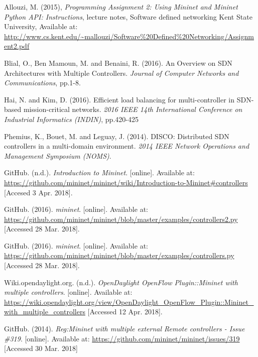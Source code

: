 \documentclass[12pt, a4paper]{article}
\begin{document}
\begin{thebibliography}{99}
  \footnotesize

  Allouzi, M. (2015),
  \textit{Programming Assignment 2: Using Mininet and Mininet Python API: Instructions},
  lecture notes,
  Software defined networking Kent State University,
  Available at: {\scriptsize \url{http://www.cs.kent.edu/~mallouzi/Software%20Defined%20Networking/Assignment2.pdf}}

  Blial, O., Ben Mamoun, M. and Benaini, R. (2016).
  An Overview on SDN Architectures with Multiple Controllers.
  \textit{Journal of Computer Networks and Communications}, pp.1-8.

  Hai, N. and Kim, D. (2016).
  Efficient load balancing for multi-controller in SDN-based mission-critical networks.
  \textit{2016 IEEE 14th International Conference on Industrial Informatics (INDIN)}, pp.420-425

  Phemius, K., Bouet, M. and Leguay, J. (2014).
  DISCO: Distributed SDN controllers in a multi-domain environment.
  \textit{2014 IEEE Network Operations and Management Symposium (NOMS)}.

  GitHub. (n.d.).
  \textit{Introduction to Mininet}. [online].
  Available at: {\scriptsize \url{https://github.com/mininet/mininet/wiki/Introduction-to-Mininet#controllers}}
  [Accesed 3 Apr. 2018].

  GitHub. (2016).
  \textit{mininet}. [online].
  Available at: {\scriptsize \url{https://github.com/mininet/mininet/blob/master/examples/controllers2.py}}
  [Accessed 28 Mar. 2018].

  GitHub. (2016).
  \textit{mininet}. [online].
  Available at: {\scriptsize \url{https://github.com/mininet/mininet/blob/master/examples/controllers.py}}
  [Accessed 28 Mar. 2018].

   Wiki.opendaylight.org. (n.d.).
   \textit{OpenDaylight OpenFlow Plugin::Mininet with multiple controllers}. [online].
   Available at: {\scriptsize \url{https://wiki.opendaylight.org/view/OpenDaylight_OpenFlow_Plugin::Mininet_with_multiple_controllers}}
   [Accessed 12 Apr. 2018].

  GitHub. (2014).
  \textit{Reg:Mininet with multiple external Remote controllers - Issue \#319}. [online].
  Available at: {\scriptsize \url{https://github.com/mininet/mininet/issues/319}}
  [Accessed 30 Mar. 2018]
\end{thebibliography}
\end{document}
